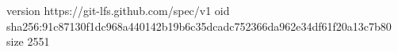 version https://git-lfs.github.com/spec/v1
oid sha256:91c87130f1dc968a440142b19b6c35dcadc752366da962e34df61f20a13c7b80
size 2551
